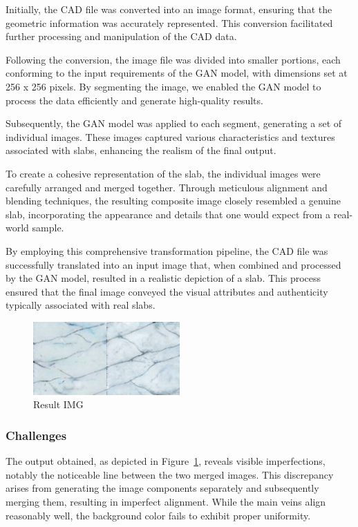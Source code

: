 Initially, the CAD file was converted into an image format, ensuring that the geometric information was accurately represented. 
This conversion facilitated further processing and manipulation of the CAD data.

Following the conversion, the image file was divided into smaller portions, each conforming to the input requirements of the GAN model, with dimensions set at 256 x 256 pixels. 
By segmenting the image, we enabled the GAN model to process the data efficiently and generate high-quality results.

Subsequently, the GAN model was applied to each segment, generating a set of individual images. 
These images captured various characteristics and textures associated with slabs, enhancing the realism of the final output.

To create a cohesive representation of the slab, the individual images were carefully arranged and merged together. 
Through meticulous alignment and blending techniques, the resulting composite image closely resembled a genuine slab, incorporating the appearance and details that one would expect from a real-world sample.

By employing this comprehensive transformation pipeline, the CAD file was successfully translated into an input image that, when combined and processed by the GAN model, resulted in a realistic depiction of a slab. 
This process ensured that the final image conveyed the visual attributes and authenticity typically associated with real slabs.

\begin{figure}
    \centering
    \includegraphics[width=0.50\textwidth]{images/cad-to-gan/result}
    \caption{Result IMG}\label{fig:cad-to-gan}
\end{figure}

\subsubsection{Challenges}\label{subsec:issues}
The output obtained, as depicted in Figure~\ref{fig:cad-to-gan}, reveals visible imperfections, notably the noticeable line between the two merged images. 
This discrepancy arises from generating the image components separately and subsequently merging them, resulting in imperfect alignment. 
While the main veins align reasonably well, the background color fails to exhibit proper uniformity.

